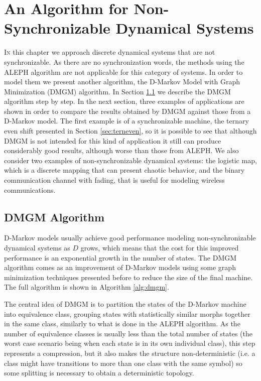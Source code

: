 \chapter{An Algorithm for Non-Synchronizable Dynamical Systems}\label{cap:5}


{\lettrine[loversize=0.25,findent=0.2em,nindent=0em]{I}{n} this chapter we approach discrete dynamical systems that are not synchronizable. As there are no synchronization words, the methods using the ALEPH algorithm are not applicable for this category of systems. In order to model them we present another algorithm, the D-Markov Model with Graph Minimization (DMGM) algorithm. In Section \ref{sec:dmgm} we describe the DMGM algorithm step by step. In the next section, three examples of applications are shown in order to compare the results obtained by DMGM against those from a D-Markov model. The first example is of a synchronizable machine, the ternary even shift presented in Section \ref{sec:terneven}, so it is possible to see that although DMGM is not intended for this kind of application it still can produce considerably good results, although worse than those from ALEPH. We also consider two examples of non-synchronizable dynamical systems: the logistic map, which is a discrete mapping that can present chaotic behavior, and the binary communication channel with fading, that is useful for modeling wireless communications.

\section{DMGM Algorithm}\label{sec:dmgm}

D-Markov models usually achieve good performance modeling non-synchronizable dynamical systems as $D$ grows, which means that the cost for this improved performance is an exponential growth in the number of states. The DMGM algorithm comes as an improvement of D-Markov models using some graph minimization techniques presented before to reduce the size of the final machine. The full algorithm is shown in Algorithm \ref{alg:dmgm}.

The central idea of DMGM is to partition the states of the D-Markov machine into equivalence class, grouping states with statistically similar morphs together in the same class, similarly to what is done in the ALEPH algorithm. As the number of equivalence classes is usually less than the total number of states (the worst case scenario being when each state is in its own individual class), this step represents a compression, but it also makes the structure non-deterministic (i.e. a class might have transitions to more than one class with the same symbol) so some splitting is necessary to obtain a deterministic topology. 

}
